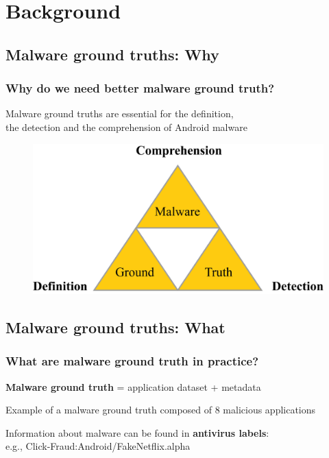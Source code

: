 \section{Background}

\subsection[Why]{Malware ground truths: Why}

\begin{frame}
    \frametitle{Why do we need better malware ground truth?}
    \centering

    Malware ground truths are essential for the definition, \\
    the detection and the comprehension of Android malware

    \begin{figure}[!ht]
        \includegraphics[width=\textwidth]{figures/background/triforce.jpg}
    \end{figure}

\end{frame}

\subsection[What]{Malware ground truths: What}

\begin{frame}
    \frametitle{What are malware ground truth in practice?}
    \centering

    \textbf{Malware ground truth} = application dataset + metadata

    \begin{table}[t]
        \resizebox{\textwidth}{!}{
            
        }
        \caption{\footnotesize{Example of a malware ground truth composed of 8 malicious applications}}
    \end{table}

    Information about malware can be found in \textbf{antivirus labels}: \\
    e.g., Click-Fraud:Android/FakeNetflix.alpha

\end{frame}

